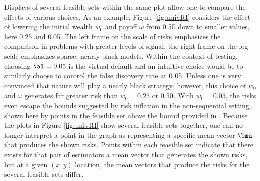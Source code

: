 \documentclass[12pt]{article}
\begin{document}
 Displays of several feasible sets within the same plot allow one to compare the
 effects of various choices.  As an example, Figure \ref{fig:univRI} considers
 the effect of lowering the initial wealth $w_0$ and payoff $\omega$ from 0.50
 down to smaller values, here 0.25 and 0.05.  The left frame on the scale of
 risks emphasizes the comparison in problems with greater levels of signal; the
 right frame on the log scale emphasizes sparse, nearly black models.  Within
 the context of testing, choosing $\al=0.05$ is the virtual default and an
 intuitive choice would be to similarly choose to control the false discovery
 rate at 0.05.  Unless one is very convinced that nature will play a nearly
 black strategy, however, this choice of $w_0$ and $\omega$ generates far
 greater risk than $w_0=0.25$ or 0.50.  With $w_0=0.05$, the risks even escape
 the bounds suggested by risk inflation in the non-sequential setting, shown
 here by points in the feasible set above the bound provided in .
  Because the plots in Figure \ref{fig:univRI} show several feasible sets
 together, one can no longer interpret a point in the graph as representing a
 specific mean vector $\bmu$ that produces the shown risks.  Points within each
 feasible set indicate that there exists for that pair of estimators a mean
 vector that generates the shown risks, but at a given $(x,y)$ location, the
 mean vectors that produce the risks for the several feasible sets differ.
\end{document}
